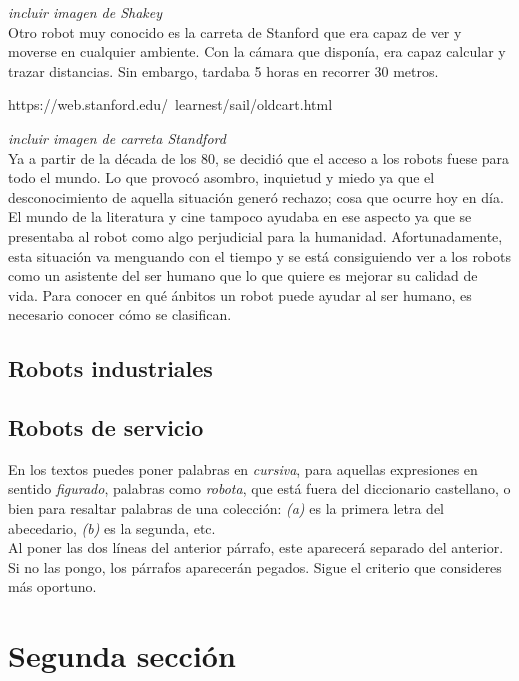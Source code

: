  \textit{incluir imagen de Shakey}\\

Otro robot muy conocido es la carreta de Stanford que era capaz de ver y moverse en cualquier ambiente. Con la cámara que disponía, era capaz calcular y trazar distancias. Sin embargo, tardaba 5 horas en recorrer 30 metros. 

https://web.stanford.edu/~learnest/sail/oldcart.html

 \textit{incluir imagen de carreta Standford}\\
 
Ya a partir de la década de los 80, se decidió que el acceso a los robots fuese para todo el mundo. Lo que provocó asombro, inquietud y miedo ya que el desconocimiento de aquella situación generó rechazo; cosa que ocurre hoy en día. El mundo de la literatura y cine tampoco ayudaba en ese aspecto ya que se presentaba al robot como algo perjudicial para la humanidad. Afortunadamente, esta situación va menguando con el tiempo y se está consiguiendo ver a los robots como un asistente del ser humano que lo que quiere es mejorar su calidad de vida. Para conocer en qué ánbitos un robot puede ayudar al ser humano, es necesario conocer cómo se clasifican. \\


\subsection{Robots industriales}




\subsection{Robots de servicio}



En los textos puedes poner palabras en \textit{cursiva}, para aquellas expresiones en sentido \textit{figurado}, palabras como \textit{robota}, que está fuera del diccionario castellano, o bien para resaltar palabras de una colección: \textit{(a)} es la primera letra del abecedario, \textit{(b)} es la segunda, etc.\\

Al poner las dos líneas del anterior párrafo, este aparecerá separado del anterior. Si no las pongo, los párrafos aparecerán pegados. Sigue el criterio que consideres más oportuno.

\section{Segunda sección}
\label{sec:segundaseccion}

